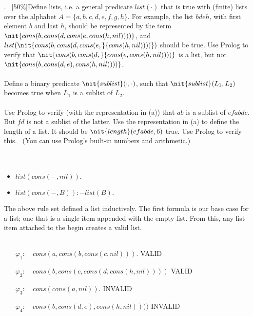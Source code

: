 \documentclass[fullpage]{article}
\begin{document}
\newpage


. \ [50\%]Define lists, i.e. a general predicate ${list}(\cdot)$ that is true with (finite) lists  over the alphabet $A = \{a,b,c,d,e, f, g, h\}$. For example, the list $bdeh$, with first element $b$ and last $h$, should be represented by the term $\nit{cons(b,cons(d,cons(e,cons(h,nil))))}$, and ${list}(\nit{cons(b,cons(d,cons(e,}{cons(h,nil))))})$ should be true. Use Prolog to verify that $\nit{cons(b,cons(d,}{cons(e,cons(h,nil))))}$ is a list, but not $\nit{cons(b,cons(d,e),cons(h,nil))))}$.\\\\
Define a binary predicate $\nit{sublist}(\cdot,\cdot)$, such  that $\nit{sublist}(L_1,L_2)$ becomes true when $L_1$ is a sublist of $L_2$.\\\\ Use Prolog to verify (with the representation in (a)) that 
$ab$ is a sublist of $efabde$. But $fd$ is not a sublist of the latter. 
Use the representation in (a) to define the length of a list. It should be $\nit{length}(efabde,6)$ true. Use Prolog to verify this. \ (You can use Prolog's built-in numbers and arithmetic.)\\\\
 \
\begin{itemize}
\item {\em $list(cons(-, nil)).$}
\item {\em $list(cons(-, B)):-list(B).$}
\end{itemize}
The above rule set defined a list inductively. The first formula is our base case for a list; one that is a single item appended with the empty list. From this, any list item attached to the begin creates a valid list.\\
\noindent {\bf Examples:} \
\begin{itemize}
\item[$\varphi_1$:]~ $cons(a,cons(b,cons(c,nil))).$ VALID
\item[$\varphi_2$:]~ $cons(b,cons(c,cons(d,cons(h,nil))))$ VALID
\item[$\varphi_3$:]~ $cons(cons(a,nil)).$ INVALID
\item[$\varphi_4$:]~ $cons(b,cons(d,e),cons(h,nil))))$ INVALID
\end{itemize}
\noindent {\bf Traces:} \
\end{document}
